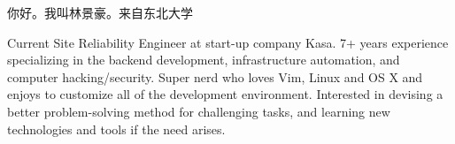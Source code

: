 

\begin{cvparagraph}

你好。我叫林景豪。来自东北大学

Current Site Reliability Engineer at start-up company Kasa. 7+ years experience specializing in the backend development, infrastructure automation, and computer hacking/security. Super nerd who loves Vim, Linux and OS X and enjoys to customize all of the development environment. Interested in devising a better problem-solving method for challenging tasks, and learning new technologies and tools if the need arises.
\end{cvparagraph}

